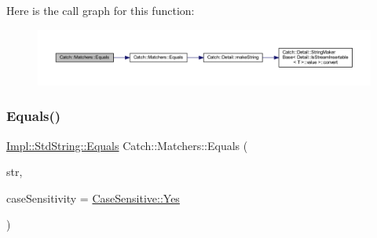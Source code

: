 Here is the call graph for this function\+:\nopagebreak
\begin{figure}[H]
\begin{center}
\leavevmode
\includegraphics[width=350pt]{namespace_catch_1_1_matchers_a840317a3d0f828642c2f55155068bb97_cgraph}
\end{center}
\end{figure}
\hypertarget{namespace_catch_1_1_matchers_a7454444261cc4af7ee0b0bc82cf74284}{}\label{namespace_catch_1_1_matchers_a7454444261cc4af7ee0b0bc82cf74284} 
\subsubsection{\texorpdfstring{Equals()}{Equals()}\hspace{0.1cm}{\footnotesize\ttfamily [2/2]}}
{\footnotesize\ttfamily \hyperlink{struct_catch_1_1_matchers_1_1_impl_1_1_std_string_1_1_equals}{Impl\+::\+Std\+String\+::\+Equals} Catch\+::\+Matchers\+::\+Equals (\begin{DoxyParamCaption}\item[{const char $\ast$}]{str,  }\item[{\hyperlink{struct_catch_1_1_case_sensitive_aad49d3aee2d97066642fffa919685c6a}{Case\+Sensitive\+::\+Choice}}]{case\+Sensitivity = {\ttfamily \hyperlink{struct_catch_1_1_case_sensitive_aad49d3aee2d97066642fffa919685c6aa7c5550b69ec3c502e6f609b67f9613c6}{Case\+Sensitive\+::\+Yes}} }\end{DoxyParamCaption})\hspace{0.3cm}{\ttfamily [inline]}}

